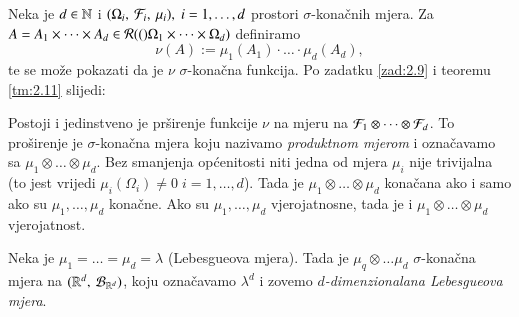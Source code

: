 Neka je $d \in \mathbb{N}$ i $(\Omega_i, \: \mathcal{F}_i, \: \mu_i), \; i = 1, \dots, d$ prostori $\sigma$-kona\v cnih mjera.
Za $A = A_1 \times \dots \times A_d \in \mathcal{R}({(})\Omega_1 \times \dots \times \Omega_d)$ definiramo
\begin{equation}    \label{jed:4.11}
    \nu (A) := \mu_1 (A_1) \cdot \dots \cdot \mu_d (A_d),
\end{equation}
te se mo\v ze pokazati da je $\nu$ $\sigma$-kona\v cna funkcija.
Po zadatku \ref{zad:2.9} i teoremu \ref{tm:2.11} slijedi:

\begin{tm}  \label{tm:4.12}
    Postoji i jedinstveno je pr\v sirenje funkcije $\nu$ na mjeru na $\mathcal{F}_1 \otimes \dots \otimes \mathcal{F}_d$.
    To pro\v sirenje je $\sigma$-kona\v cna mjera koju nazivamo \emph{produktnom mjerom} i ozna\v cavamo sa $\mu_1 \otimes \dots \otimes \mu_d$.
    Bez smanjenja op\' cenitosti niti jedna od mjera $\mu_i$ nije trivijalna (to jest vrijedi $\mu_i (\Omega_i) \neq 0 \; i=1, \dots, d$).
    Tada je $\mu_1 \otimes \dots \otimes \mu_d$ kona\v cana ako i samo ako su $\mu_1, \dots, \mu_d$ kona\v cne.
    Ako su $\mu_1, \dots, \mu_d$ vjerojatnosne, tada je i $\mu_1 \otimes \dots \otimes \mu_d$ vjerojatnost. 
\end{tm}

\begin{pr}  \label{pr:4.13}
    Neka je $\mu_1 = \dots = \mu_d = \lambda$ (Lebesgueova mjera).
    Tada je $\mu_q \otimes \dots \mu_d$ $\sigma$-kona\v cna mjera na $({\mathbb{R}^d}, \: {\mathcal{B}_{\mathbb{R}^d}})$, koju ozna\v cavamo $\lambda^d$ i zovemo \emph{$d$-dimenzionalana Lebesgueova mjera}.
\end{pr}

